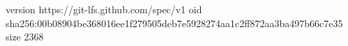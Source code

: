 version https://git-lfs.github.com/spec/v1
oid sha256:00b08904be368016ee1f279505deb7e5928274aa1c2ff872aa3ba497b66c7e35
size 2368
